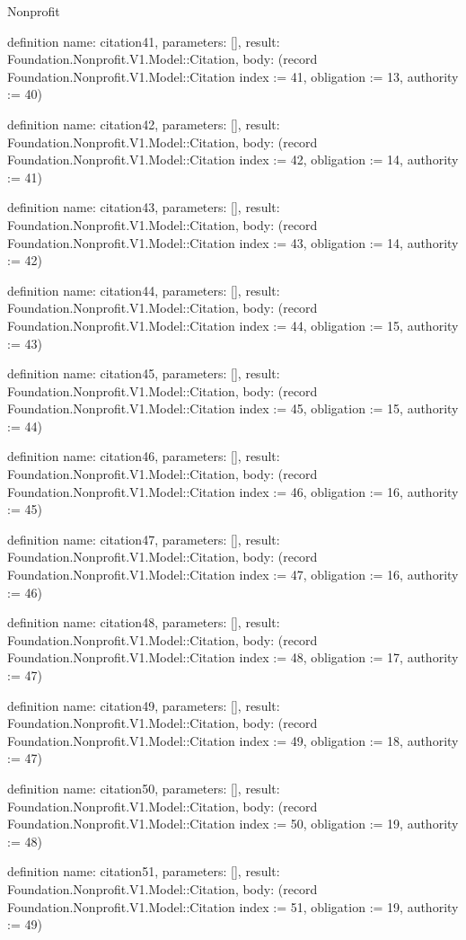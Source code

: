 \begin{lexlean}{Nonprofit}
\begin{semanticmodule}
definition{
  name: citation41,
  parameters: [],
  result: Foundation.Nonprofit.V1.Model::Citation,
  body: (record Foundation.Nonprofit.V1.Model::Citation {index := 41, obligation := 13, authority := 40})
}

definition{
  name: citation42,
  parameters: [],
  result: Foundation.Nonprofit.V1.Model::Citation,
  body: (record Foundation.Nonprofit.V1.Model::Citation {index := 42, obligation := 14, authority := 41})
}

definition{
  name: citation43,
  parameters: [],
  result: Foundation.Nonprofit.V1.Model::Citation,
  body: (record Foundation.Nonprofit.V1.Model::Citation {index := 43, obligation := 14, authority := 42})
}

definition{
  name: citation44,
  parameters: [],
  result: Foundation.Nonprofit.V1.Model::Citation,
  body: (record Foundation.Nonprofit.V1.Model::Citation {index := 44, obligation := 15, authority := 43})
}

definition{
  name: citation45,
  parameters: [],
  result: Foundation.Nonprofit.V1.Model::Citation,
  body: (record Foundation.Nonprofit.V1.Model::Citation {index := 45, obligation := 15, authority := 44})
}

definition{
  name: citation46,
  parameters: [],
  result: Foundation.Nonprofit.V1.Model::Citation,
  body: (record Foundation.Nonprofit.V1.Model::Citation {index := 46, obligation := 16, authority := 45})
}

definition{
  name: citation47,
  parameters: [],
  result: Foundation.Nonprofit.V1.Model::Citation,
  body: (record Foundation.Nonprofit.V1.Model::Citation {index := 47, obligation := 16, authority := 46})
}

definition{
  name: citation48,
  parameters: [],
  result: Foundation.Nonprofit.V1.Model::Citation,
  body: (record Foundation.Nonprofit.V1.Model::Citation {index := 48, obligation := 17, authority := 47})
}

definition{
  name: citation49,
  parameters: [],
  result: Foundation.Nonprofit.V1.Model::Citation,
  body: (record Foundation.Nonprofit.V1.Model::Citation {index := 49, obligation := 18, authority := 47})
}

definition{
  name: citation50,
  parameters: [],
  result: Foundation.Nonprofit.V1.Model::Citation,
  body: (record Foundation.Nonprofit.V1.Model::Citation {index := 50, obligation := 19, authority := 48})
}

definition{
  name: citation51,
  parameters: [],
  result: Foundation.Nonprofit.V1.Model::Citation,
  body: (record Foundation.Nonprofit.V1.Model::Citation {index := 51, obligation := 19, authority := 49})
}


\end{semanticmodule}
\end{lexlean}
